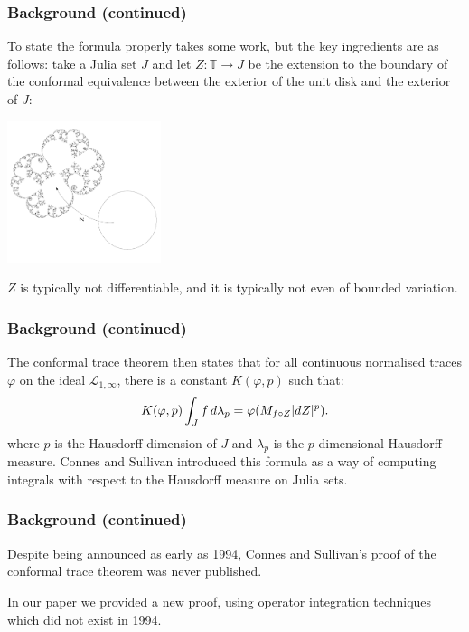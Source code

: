 \documentclass{beamer} %
\theoremstyle{definition} %
\newcommand{\Circ}{\mathbb{T}}
\newcommand{\Lc}{\mathcal{L}}
\newcommand{\FiniteRank}{\mathrm{FiniteRank}}
\newcommand{\SepPart}[1]{\overline{\FiniteRank}^{\Lc_{#1,\infty}}}
\def\qd{\,{\mathchar'26\mkern-12mu d}}
\begin{document}
\begin{frame}\frametitle{Background (continued)}
    To state the formula properly takes some work, but the key ingredients are as follows: take a Julia set $J$ and let $Z:\Circ\to J$ be the extension
    to the boundary of the conformal equivalence between the exterior of the unit disk and the exterior of $J$:
    \begin{center}
        \includegraphics[width=45mm]{img/riemann-mapping.png}
    \end{center}
    $Z$ is typically not differentiable, and it is typically not even of bounded variation.
\end{frame}

\begin{frame}\frametitle{Background (continued)}
    The conformal trace theorem then states that for all continuous normalised traces $\varphi$ on the ideal $\Lc_{1,\infty}$, there is a constant $K(\varphi,p)$ such that:
    \begin{equation*}
        K(\varphi,p)\int_J f\,d\lambda_p = \varphi(M_{f\circ Z}|\qd Z|^p).
    \end{equation*}
    where $p$ is the Hausdorff dimension of $J$ and $\lambda_p$ is the $p$-dimensional Hausdorff measure. Connes and Sullivan introduced this formula as a way of computing integrals with respect to the Hausdorff measure on Julia sets.
\end{frame}

\begin{frame}\frametitle{Background (continued)}
    Despite being announced as early as 1994, Connes and Sullivan's proof of the conformal trace theorem was never published.
    
    In our paper we provided a new proof, using operator integration techniques which did not exist in 1994.
\end{frame}

\end{document}
